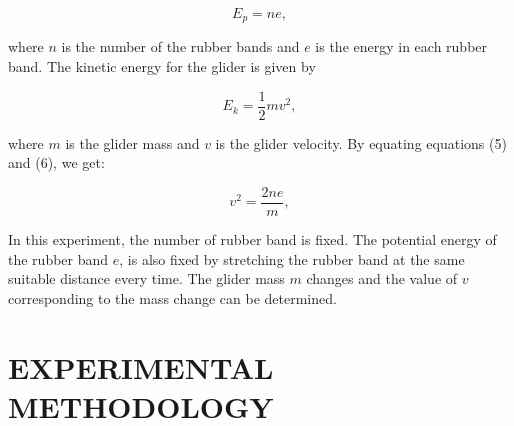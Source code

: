 \documentclass[a4paper,11pt]{article}
\begin{document}
\begin{equation}
E_p = ne,
\end{equation}

where \( n \) is the number of the rubber bands and \( e \) is the energy in each rubber band. The kinetic energy for the glider is given by

\begin{equation}
E_k = \frac{1}{2} mv^2,
\end{equation}

where \( m \) is the glider mass and \( v \) is the glider velocity. By equating equations (5) and (6), we get:

\begin{equation}
v^2 = \frac{2ne}{m},
\end{equation}

In this experiment, the number of rubber band is fixed. The potential energy of the rubber band \( e \), is also fixed by stretching the rubber band at the same suitable distance every time. The glider mass \( m \) changes and the value of \( v \) corresponding to the mass change can be determined.

\newpage
{}
\section*{\center EXPERIMENTAL METHODOLOGY}
\label{sec:EXPERIMENTAL METHODOLOGY}
\end{document}
